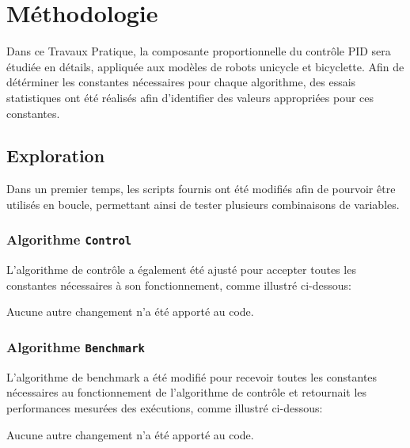 \documentclass[../CSC_5RO16_TA_TP3.tex]{subfiles}
\begin{document}
\section{Méthodologie}
\noindent Dans ce Travaux Pratique, la composante proportionnelle du contrôle PID sera étudiée en détails, appliquée aux modèles de robots unicycle et bicyclette. Afin de détérminer les constantes nécessaires pour chaque algorithme, des essais statistiques ont été réalisés afin d'identifier des valeurs appropriées pour ces constantes.


\subsection{Exploration}
\noindent Dans un premier temps, les scripts fournis ont été modifiés afin de pourvoir être utilisés en boucle, permettant ainsi de tester plusieurs combinaisons de variables.

\subsubsection{Algorithme \texttt{Control}}
\noindent L'algorithme de contrôle a également été ajusté pour accepter toutes les constantes nécessaires à son fonctionnement, comme illustré ci-dessous:

\begin{scriptsize}\mycode
    
\end{scriptsize}
\begin{remark}
    Aucune autre changement n'a été apporté au code.
\end{remark}

\subsubsection{Algorithme \texttt{Benchmark}}
\noindent L'algorithme de benchmark a été modifié pour recevoir toutes les constantes nécessaires au fonctionnement de l'algorithme de contrôle et retournait les performances mesurées des exécutions, comme illustré ci-dessous:

\begin{scriptsize}\mycode
    
\end{scriptsize}
\begin{remark}
    Aucune autre changement n'a été apporté au code.
\end{remark}
\end{document}
